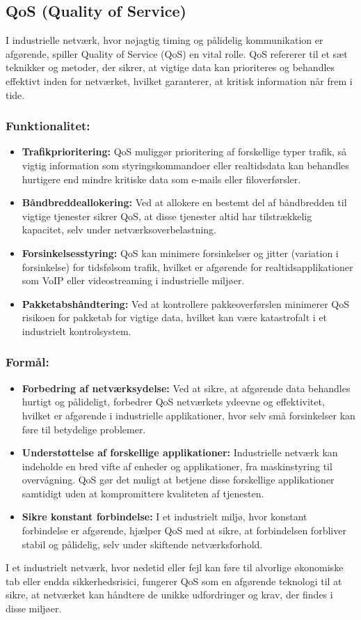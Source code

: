 \subsection{QoS (Quality of Service)}
I industrielle netværk, hvor nøjagtig timing og pålidelig kommunikation er afgørende, spiller Quality of Service (QoS) en vital rolle. QoS refererer til et sæt teknikker og metoder, der sikrer, at vigtige data kan prioriteres og behandles effektivt inden for netværket, hvilket garanterer, at kritisk information når frem i tide.
\subsubsection{Funktionalitet:}
\begin{itemize}
	\item \textbf{Trafikprioritering:} QoS muliggør prioritering af forskellige typer trafik, så vigtig information som styringskommandoer eller realtidsdata kan behandles hurtigere end mindre kritiske data som e-mails eller filoverførsler.
	\item \textbf{Båndbreddeallokering:} Ved at allokere en bestemt del af båndbredden til vigtige tjenester sikrer QoS, at disse tjenester altid har tilstrækkelig kapacitet, selv under netværksoverbelastning.
	\item \textbf{Forsinkelsesstyring:} QoS kan minimere forsinkelser og jitter (variation i forsinkelse) for tidsfølsom trafik, hvilket er afgørende for realtidsapplikationer som VoIP eller videostreaming i industrielle miljøer.
	\item \textbf{Pakketabshåndtering:} Ved at kontrollere pakkeoverførslen minimerer QoS risikoen for pakketab for vigtige data, hvilket kan være katastrofalt i et industrielt kontrolsystem.
\end{itemize}
\subsubsection{Formål:}
\begin{itemize}
	\item \textbf{Forbedring af netværksydelse:} Ved at sikre, at afgørende data behandles hurtigt og pålideligt, forbedrer QoS netværkets ydeevne og effektivitet, hvilket er afgørende i industrielle applikationer, hvor selv små forsinkelser kan føre til betydelige problemer.
	\item \textbf{Understøttelse af forskellige applikationer:} 
	Industrielle netværk kan indeholde en bred vifte af enheder og applikationer, fra maskinstyring til overvågning. QoS gør det muligt at betjene disse forskellige applikationer samtidigt uden at kompromittere kvaliteten af tjenesten.
	\item \textbf{Sikre konstant forbindelse:} I et industrielt miljø, hvor konstant\\
	forbindelse er afgørende, hjælper QoS med at sikre, at forbindelsen forbliver stabil og pålidelig, selv under skiftende netværksforhold.
\end{itemize}
I et industrielt netværk, hvor nedetid eller fejl kan føre til alvorlige økonomiske tab eller endda sikkerhedsrisici, fungerer QoS som en afgørende teknologi til at sikre, at netværket kan håndtere de unikke udfordringer og krav, der findes i disse miljøer.